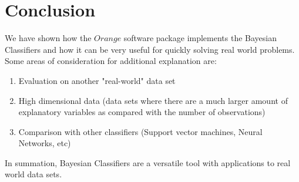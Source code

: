 

\graphicspath{{C:/Documents and Settings/amcelhinney/My Documents/GitHub/MCS507ProjectTwo/tex/include/}}

\section{Conclusion} %
We have shown how the $Orange$ software package implements the Bayesian Classifiers and how it can be very useful for quickly solving real world problems. Some areas of consideration for additional explanation are:
\begin{enumerate}
\item Evaluation on another "real-world" data set
\item High dimensional data (data sets where there are a much larger amount of explanatory variables as compared with the number of observations)
\item Comparison with other classifiers (Support vector machines, Neural Networks, etc)
\end{enumerate}

In summation, Bayesian Classifiers are a versatile tool with applications to real world data sets. 
